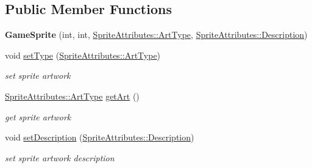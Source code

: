 \subsection*{Public Member Functions}
\begin{DoxyCompactItemize}
\item 
\mbox{\label{class_game_sprite_a9e97eb36451f2609f7ff28a25ea9c09d}} 
{\bfseries Game\+Sprite} (int, int, \mbox{\hyperlink{namespace_sprite_attributes_afb5447c311bc29f0ce8ddfd025c6e998}{Sprite\+Attributes\+::\+Art\+Type}}, \mbox{\hyperlink{namespace_sprite_attributes_a3ece96d6288b14d53d84e2138392395c}{Sprite\+Attributes\+::\+Description}})
\item 
\mbox{\label{class_game_sprite_a58f1b3fce8064be9921bd37869e9b117}} 
void \mbox{\hyperlink{class_game_sprite_a58f1b3fce8064be9921bd37869e9b117}{set\+Type}} (\mbox{\hyperlink{namespace_sprite_attributes_afb5447c311bc29f0ce8ddfd025c6e998}{Sprite\+Attributes\+::\+Art\+Type}})
\begin{DoxyCompactList}\small\item\em set sprite artwork \end{DoxyCompactList}\item 
\mbox{\label{class_game_sprite_a7125087aa8a0c333a7aa6835ecf8c6c8}} 
\mbox{\hyperlink{namespace_sprite_attributes_afb5447c311bc29f0ce8ddfd025c6e998}{Sprite\+Attributes\+::\+Art\+Type}} \mbox{\hyperlink{class_game_sprite_a7125087aa8a0c333a7aa6835ecf8c6c8}{get\+Art}} ()
\begin{DoxyCompactList}\small\item\em get sprite artwork \end{DoxyCompactList}\item 
\mbox{\label{class_game_sprite_a28d3d766c1f6cacc84445fdfe5b6e25e}} 
void \mbox{\hyperlink{class_game_sprite_a28d3d766c1f6cacc84445fdfe5b6e25e}{set\+Description}} (\mbox{\hyperlink{namespace_sprite_attributes_a3ece96d6288b14d53d84e2138392395c}{Sprite\+Attributes\+::\+Description}})
\begin{DoxyCompactList}\small\item\em set sprite artwork description \end{DoxyCompactList}\item 
\mbox{\label{class_game_sprite_a2ca8b811d79fbceae18e02c934e3e85b}} 

\end{DoxyCompactItemize}
